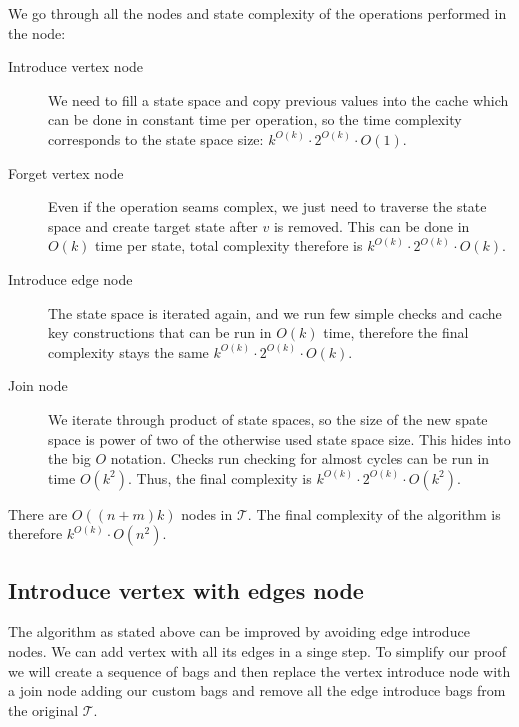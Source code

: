 We go through all the nodes and state complexity of the operations performed in the node:
\begin{description}
	\item[Introduce vertex node]
	      We need to fill a state space and copy previous values into the cache
	      which can be done in constant time per operation,
	      so the time complexity corresponds to the state space size:
	      \( {k}^{O(k)} \cdot 2^{O(k)} \cdot O(1) \).
	\item[Forget vertex node]
	      Even if the operation seams complex, we just need to traverse the state space
	      and create target state after \( v \) is removed. This can be done in \( O(k) \) time
	      per state, total complexity therefore is
	      \( {k}^{O(k)} \cdot 2^{O(k)} \cdot O(k) \).
	\item[Introduce edge node]
	      The state space is iterated again, and we run few simple checks and cache key constructions
	      that can be run in \( O(k) \) time, therefore the final complexity stays the same
	      \( {k}^{O(k)} \cdot 2^{O(k)} \cdot O(k) \).
	\item[Join node]
	      We iterate through product of state spaces,
	      so the size of the new spate space is power of two
	      of the otherwise used state space size.
	      This hides into the big \( O \) notation.
	      Checks run checking for almost cycles can be run in time \( O(k^2) \).
	      Thus, the final		complexity is
	      \( {k}^{O(k)} \cdot 2^{O(k)} \cdot O(k^2) \).
\end{description}

There are \( O((n+m)k) \) nodes in \( \mathcal{T} \).
The final complexity of the algorithm is therefore
\( {k}^{O(k)} \cdot O(n^2) \).

\subsection{Introduce vertex with edges node}

The algorithm as stated above can be improved by avoiding edge introduce nodes.
We can add vertex with all its edges in a singe step.
To simplify our proof we will create a sequence of bags and then replace the
vertex introduce node with a join node adding our custom bags
and remove all the edge introduce bags from the original \( \mathcal{T} \).

